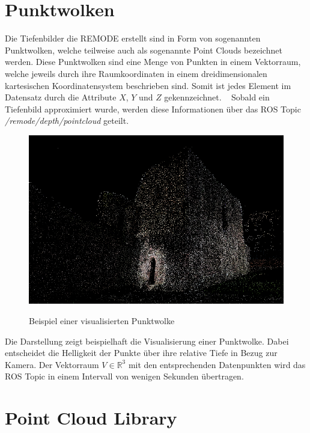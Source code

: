 \section{Punktwolken}
\label{Punktwolken}
Die Tiefenbilder die REMODE erstellt sind in Form von sogenannten Punktwolken, welche teilweise auch als sogenannte Point Clouds bezeichnet werden. Diese Punktwolken sind eine Menge von Punkten in einem Vektorraum, welche jeweils durch ihre Raumkoordinaten in einem dreidimensionalen kartesischen Koordinatensystem beschrieben sind. Somit ist jedes Element im Datensatz durch die Attribute $X$, $Y$ und $Z$ gekennzeichnet. \cite{defPC}\cite{visPC}\ \newline
Sobald ein Tiefenbild approximiert wurde, werden diese Informationen über das ROS Topic \textit{/remode/depth/pointcloud} geteilt. \newline

\begin{figure}[ht]
	\centering
	\includegraphics[scale=0.41]{Bilder/pointcloud_1.jpg}
	\label{fig:pointcloud}
	\caption{Beispiel einer visualisierten Punktwolke \cite{visPC}}
\end{figure}

Die Darstellung zeigt beispielhaft die Visualisierung einer Punktwolke. Dabei entscheidet die Helligkeit der Punkte über ihre relative Tiefe in Bezug zur Kamera. Der Vektorraum $V \in \mathbb{R}^3$ mit den entsprechenden Datenpunkten wird das ROS Topic in einem Intervall von wenigen Sekunden übertragen.\newline

\section{Point Cloud Library}

